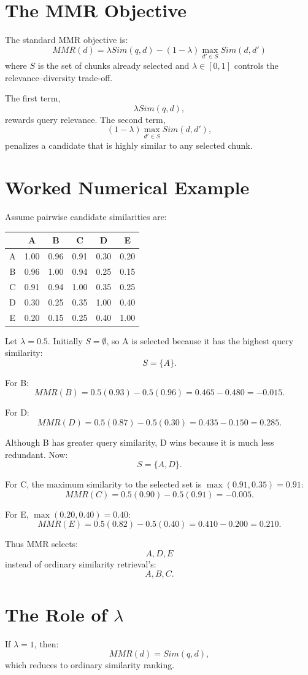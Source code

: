 \documentclass[12pt,a4paper]{article}
\begin{document}
\section{The MMR Objective}
The standard MMR objective is:
\[
\boxed{MMR(d)=\lambda Sim(q,d)-(1-\lambda)\max_{d'\in S}Sim(d,d')}
\]
where $S$ is the set of chunks already selected and $\lambda\in[0,1]$ controls the relevance--diversity trade-off.

The first term,
\[
\lambda Sim(q,d),
\]
rewards query relevance. The second term,
\[
(1-\lambda)\max_{d'\in S}Sim(d,d'),
\]
penalizes a candidate that is highly similar to any selected chunk.

\section{Worked Numerical Example}
Assume pairwise candidate similarities are:
\begin{center}
\begin{tabular}{c|ccccc}
&A&B&C&D&E\\\midrule
A&1.00&0.96&0.91&0.30&0.20\\
B&0.96&1.00&0.94&0.25&0.15\\
C&0.91&0.94&1.00&0.35&0.25\\
D&0.30&0.25&0.35&1.00&0.40\\
E&0.20&0.15&0.25&0.40&1.00
\end{tabular}
\end{center}

Let $\lambda=0.5$. Initially $S=\emptyset$, so A is selected because it has the highest query similarity:
\[
S=\{A\}.
\]

For B:
\[
MMR(B)=0.5(0.93)-0.5(0.96)=0.465-0.480=\boxed{-0.015}.
\]

For D:
\[
MMR(D)=0.5(0.87)-0.5(0.30)=0.435-0.150=\boxed{0.285}.
\]

Although B has greater query similarity, D wins because it is much less redundant. Now:
\[
S=\{A,D\}.
\]

For C, the maximum similarity to the selected set is $\max(0.91,0.35)=0.91$:
\[
MMR(C)=0.5(0.90)-0.5(0.91)=\boxed{-0.005}.
\]

For E, $\max(0.20,0.40)=0.40$:
\[
MMR(E)=0.5(0.82)-0.5(0.40)=0.410-0.200=\boxed{0.210}.
\]

Thus MMR selects:
\[
\boxed{A,D,E}
\]
instead of ordinary similarity retrieval's:
\[
\boxed{A,B,C}.
\]

\section{The Role of $\lambda$}
If $\lambda=1$, then:
\[
MMR(d)=Sim(q,d),
\]
which reduces to ordinary similarity ranking.
\end{document}
